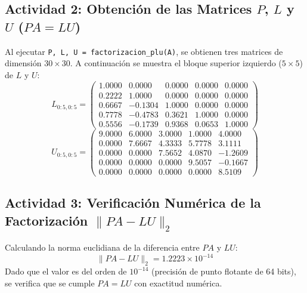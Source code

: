 \documentclass[11pt,a4paper]{article}
\begin{document}
\subsection{Actividad 2: Obtención de las Matrices $P$, $L$ y $U$ ($PA = LU$)}
Al ejecutar \texttt{P, L, U = factorizacion\_plu(A)}, se obtienen tres matrices de dimensión $30 \times 30$. A continuación se muestra el bloque superior izquierdo ($5 \times 5$) de $L$ y $U$:
\begin{equation}
    L_{0:5, 0:5} = \begin{pmatrix}
        1.0000 & 0.0000 & 0.0000 & 0.0000 & 0.0000 \\
        0.2222 & 1.0000 & 0.0000 & 0.0000 & 0.0000 \\
        0.6667 & -0.1304 & 1.0000 & 0.0000 & 0.0000 \\
        0.7778 & -0.4783 & 0.3621 & 1.0000 & 0.0000 \\
        0.5556 & -0.1739 & 0.9368 & 0.0653 & 1.0000
    \end{pmatrix}
\end{equation}
\begin{equation}
    U_{0:5, 0:5} = \begin{pmatrix}
        9.0000 & 6.0000 & 3.0000 & 1.0000 & 4.0000 \\
        0.0000 & 7.6667 & 4.3333 & 5.7778 & 3.1111 \\
        0.0000 & 0.0000 & 7.5652 & 4.0870 & -1.2609 \\
        0.0000 & 0.0000 & 0.0000 & 9.5057 & -0.1667 \\
        0.0000 & 0.0000 & 0.0000 & 0.0000 & 8.5109
    \end{pmatrix}
\end{equation}

\subsection{Actividad 3: Verificación Numérica de la Factorización $\|PA - LU\|_2$}
Calculando la norma euclidiana de la diferencia entre $PA$ y $LU$:
\begin{equation}
    \|P A - L U\|_2 = 1.2223 \times 10^{-14}
\end{equation}
Dado que el valor es del orden de $10^{-14}$ (precisión de punto flotante de 64 bits), se verifica que se cumple $PA = LU$ con exactitud numérica.
\end{document}
